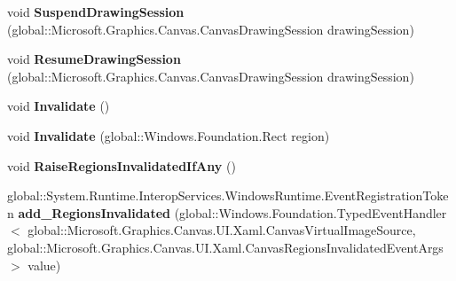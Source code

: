 \begin{DoxyCompactItemize}
void {\bfseries Suspend\+Drawing\+Session} (global\+::\+Microsoft.\+Graphics.\+Canvas.\+Canvas\+Drawing\+Session drawing\+Session)
\item 
\mbox{\label{interface_microsoft_1_1_graphics_1_1_canvas_1_1_u_i_1_1_xaml_1_1_i_canvas_virtual_image_source_a501ef07bf7ed03a1dbaf87016f789ac5}} 
void {\bfseries Resume\+Drawing\+Session} (global\+::\+Microsoft.\+Graphics.\+Canvas.\+Canvas\+Drawing\+Session drawing\+Session)
\item 
\mbox{\label{interface_microsoft_1_1_graphics_1_1_canvas_1_1_u_i_1_1_xaml_1_1_i_canvas_virtual_image_source_a73580d63c0dbcf49067c8188bbc17f11}} 
void {\bfseries Invalidate} ()
\item 
\mbox{\label{interface_microsoft_1_1_graphics_1_1_canvas_1_1_u_i_1_1_xaml_1_1_i_canvas_virtual_image_source_a8abbf69a507cfa89ef9d4a6b113d2fbb}} 
void {\bfseries Invalidate} (global\+::\+Windows.\+Foundation.\+Rect region)
\item 
\mbox{\label{interface_microsoft_1_1_graphics_1_1_canvas_1_1_u_i_1_1_xaml_1_1_i_canvas_virtual_image_source_a4a0609ae8d5cff634e5c29e0a749f233}} 
void {\bfseries Raise\+Regions\+Invalidated\+If\+Any} ()
\item 
\mbox{\label{interface_microsoft_1_1_graphics_1_1_canvas_1_1_u_i_1_1_xaml_1_1_i_canvas_virtual_image_source_ad46426bf1b7c4443b87a1e998db5c012}} 
global\+::\+System.\+Runtime.\+Interop\+Services.\+Windows\+Runtime.\+Event\+Registration\+Token {\bfseries add\+\_\+\+Regions\+Invalidated} (global\+::\+Windows.\+Foundation.\+Typed\+Event\+Handler$<$ global\+::\+Microsoft.\+Graphics.\+Canvas.\+U\+I.\+Xaml.\+Canvas\+Virtual\+Image\+Source, global\+::\+Microsoft.\+Graphics.\+Canvas.\+U\+I.\+Xaml.\+Canvas\+Regions\+Invalidated\+Event\+Args $>$ value)
\item 
\mbox{\label{interface_microsoft_1_1_graphics_1_1_canvas_1_1_u_i_1_1_xaml_1_1_i_canvas_virtual_image_source_a46e07a464bbb440ccaf5550dea1da55f}} 

\end{DoxyCompactItemize}
